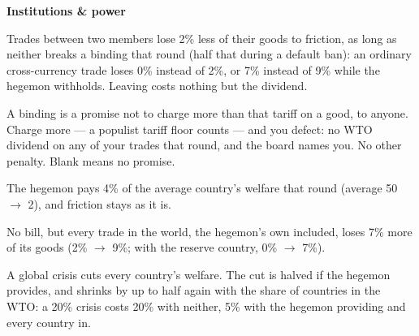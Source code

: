 \documentclass[11pt]{article}
\begin{document}
{\bfseries Institutions \& power}\par
{\footnotesize
\begin{description}[nosep,style=sameline,leftmargin=5.6em,font=\normalfont\bfseries]
  \item[WTO] Trades between two members lose 2\% less of their goods to friction, as long as neither breaks a binding that round (half that during a default ban): an ordinary cross-currency trade loses 0\% instead of 2\%, or 7\% instead of 9\% while the hegemon withholds. Leaving costs nothing but the dividend.
  \item[Bindings] A binding is a promise not to charge more than that tariff on a good, to anyone. Charge more --- a populist tariff floor counts --- and you defect: no WTO dividend on any of your trades that round, and the board names you. No other penalty. Blank means no promise.
  \item[Provide] The hegemon pays 4\% of the average country's welfare that round (average 50 $\to$ 2), and friction stays as it is.
  \item[Withhold] No bill, but every trade in the world, the hegemon's own included, loses 7\% more of its goods (2\% $\to$ 9\%; with the reserve country, 0\% $\to$ 7\%).
  \item[Crisis] A global crisis cuts every country's welfare. The cut is halved if the hegemon provides, and shrinks by up to half again with the share of countries in the WTO: a 20\% crisis costs 20\% with neither, 5\% with the hegemon providing and every country in.
\end{description}}
\end{document}
